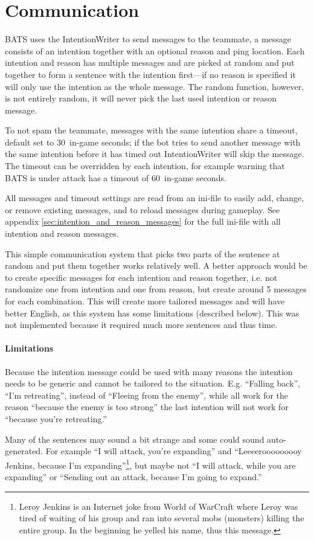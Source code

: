 \section{Communication}
\label{sec:communication}
BATS uses the IntentionWriter to send messages to the teammate, a message consists of an
intention together with an optional reason and ping location.
Each intention and reason has multiple messages and are picked at random and put together to form a 
sentence with the intention first—if no reason is specified it will only use the intention as
the whole message. The random function, however, is not entirely random, it will never pick the last
used intention or reason message.

To not spam the teammate, messages with the same intention share a timeout, default set to 30\conf~in-game
seconds; if the bot tries to send another message with the same intention before it has timed out
IntentionWriter will skip the message. The timeout can be overridden by each intention, for example
warning that BATS is under attack has a timeout of 60\conf~in-game seconds.

All messages and timeout settings are read from an ini-file to easily add, change, or remove
existing messages, and to reload messages during gameplay. See appendix
\ref{sec:intention_and_reason_messages} for the full ini-file with all intention and reason
messages.

This simple communication system that picks two parts of the sentence at random and put them
together works relatively well. A better approach would be to create
specific messages for each intention and reason together, i.e. not randomize one from intention
and one from reason, but create around 5 messages for each combination. This will create more
tailored messages and will have better English, as this system has some limitations (described
below). This was not implemented because it required much more sentences and thus time.

\paragraph{Limitations}
Because the intention message could be used with many reasons the intention needs to be generic and
cannot be tailored to the situation. E.g. ``Falling back'', ``I'm retreating'', instead of ``Fleeing
from the enemy'', while all work for the reason ``because the enemy is too strong'' the last
intention will not work for ``because you're retreating.''

Many of the sentences may sound a bit strange and some could sound auto-generated. For example ``I
will attack, you're expanding'' and ``Leeeerooooooooy Jenkins, because I'm
expanding''\footnote{Leroy Jenkins is an Internet joke from World of WarCraft where Leroy was tired
of waiting of his group and ran into several mobs (monsters) killing the entire group. In the
beginning he yelled his name, thus this message.}, but maybe not ``I will attack, while you are
expanding'' or ``Sending out an attack, because I'm going to expand.''
